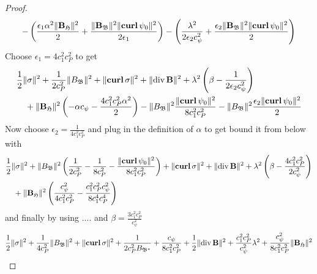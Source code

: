 \documentclass[../master_thesis.tex]{subfiles}
\begin{document}
\begin{proof}
\begin{align*}
            - \left( \frac{\epsilon_1 \alpha^2 \lVert \mathbf{B}_\mathfrak{H} \rVert^2}{2} 
            + \frac{\lVert \mathbf{B}_\mathfrak{B} \rVert^2 \lVert  \veccurl \psi_0 \rVert^2}{2 \epsilon_1} \right)
            - \left( \frac{\lambda^2}{2 \epsilon_2 c_\psi^2} 
            + \frac{\epsilon_2 \lVert \mathbf{B}_\mathfrak{B} \rVert^2 \lVert  \veccurl \psi_0 \rVert^2}{2} \right)
    \end{align*}
    Choose $\epsilon_1 = 4 c_1^2 c_P^2$ to get 
    \begin{align*}
        &\frac{1}{2} \lVert \sigma \rVert^2 + \frac{1}{2 c_P^2} \lVert B_\mathfrak{B} \rVert^2
        + \lVert  \veccurl \sigma \rVert^2 + \lVert \diver \mathbf{B} \rVert ^2
        + \lambda ^2 \left( \beta - \frac{1}{2 \epsilon_2 c_\psi^2} \right) 
        \\ &\quad+ \lVert \mathbf{B}_\mathfrak{H} \rVert^2 
        \left( - \alpha c_\psi - \frac{4 c_1^2 c_P^2 \alpha^2}{2} \right)
        - \lVert B_\mathfrak{B} \rVert^2 \frac{\lVert  \veccurl \psi_0 \rVert^2}{8c_1^2 c_P^2}
        - \lVert B_\mathfrak{B} \rVert^2 \frac{ \epsilon_2 \lVert  \veccurl \psi_0 \rVert^2 }{2}
    \end{align*}
    Now choose $\epsilon_2 = \frac{1}{4 c_1^2 c_P^2}$ and plug in the definition of $\alpha$
    to get bound it from below with
    \begin{align*}
        &\frac{1}{2} \lVert \sigma \rVert^2 + \lVert B_\mathfrak{B} \rVert^2 
        \left( \frac{1}{2 c_P^2} - \frac{1}{8 c_P^2} 
        - \frac{\lVert  \veccurl \psi_0 \rVert^2}{8 c_1^2 c_P^2} \right)
        + \lVert  \veccurl \sigma \rVert^2 + \lVert \diver \mathbf{B} \rVert ^2
        + \lambda ^2 \left( \beta - \frac{4 c_1^2 c_P^2}{2 c_\psi^2} \right)
        \\ &\quad+ \lVert \mathbf{B}_\mathfrak{H} \rVert^2  \left( \frac{c_\psi^2}{4 c_1^2 c_P^2 }
        - \frac{ c_1^2 c_P^2 c_\psi^2}{8 c_1^4 c_P^4} \right)
    \end{align*}
    and finally by using .... and $\beta = \frac{3 c_1^2 c_P^2}{c_\psi^2}$
    \begin{align*}
        \frac{1}{2} \lVert \sigma \rVert^2 + \frac{1}{4 c_P^2}\lVert B_\mathfrak{B} \rVert^2 
        + \lVert  \veccurl \sigma \rVert^2
        + \frac{1}{2 c_P^2 B_{\mathfrak{B}^*}} + \frac{c_\psi}{8 c_1^2 c_P^2} 
        + \frac{1}{2} \lVert \diver \mathbf{B} \rVert ^2
        + \frac{c_1^2 c_P^2}{c_\psi^2}\lambda^2
        + \frac{c_\psi^2}{8 c_1^2 c_P^2} \lVert \mathbf{B}_\mathfrak{H} \rVert^2 
    \end{align*}
\end{proof}
\end{document}
